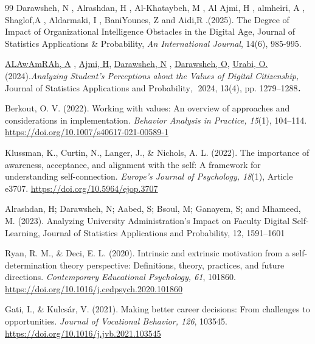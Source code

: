 \documentclass[10pt]{NSP1}
\providecommand{\ul}[1]{\underline{#1}}
\begin{document}
\begin{thebibliography}{99}
 Darawsheh, N , Alrashdan, H , Al-Khataybeh, M , Al Ajmi, H , almheiri, A , Shaglof,A , Aldarmaki, I , BaniYounes, Z and Aidi,R .(2025). The Degree of Impact of Organizational Intelligence Obstacles in the Digital Age, Journal of Statistics Applications \& Probability, \emph{An International Journal}, 14(6), 985-995.

 \href{https://www.scopus.com/authid/detail.uri?authorId=57299687800}{ALAwAmRAh, A} , \href{https://www.scopus.com/authid/detail.uri?authorId=59210073600}{Ajmi, H}, \href{https://www.scopus.com/authid/detail.uri?authorId=59171231500}{Darawsheh, N} , \href{https://www.scopus.com/authid/detail.uri?authorId=58808922400}{Darawsheh, O}, \href{https://www.scopus.com/authid/detail.uri?authorId=59210786400}{Urabi, O.}(2024).\emph{Analyzing Student's Perceptions about the Values of Digital Citizenship,} Journal of Statistics Applications and Probability\emph{,\textbf{~}}2024, 13(4), pp. 1279--1288\emph{\textbf{.}}

 Berkout, O. V. (2022). Working with values: An overview of approaches and considerations in implementation. \emph{Behavior Analysis in Practice, 15}(1), 104--114. \href{https://doi.org/10.1007/s40617-021-00589-1}{\ul{https://doi.org/10.1007/s40617-021-00589-1}}

 Klussman, K., Curtin, N., Langer, J., \& Nichols, A. L. (2022). The importance of awareness, acceptance, and alignment with the self: A framework for understanding self-connection. \emph{Europe's Journal of Psychology, 18}(1), Article e3707. \href{https://doi.org/10.5964/ejop.3707}{\ul{https://doi.org/10.5964/ejop.3707}}

 Alrashdan, H; Darawsheh, N; Aabed, S; Bsoul, M; Ganayem, S; and Mhameed, M. (2023). Analyzing University Administration's Impact on Faculty Digital Self-Learning, Journal of Statistics Applications and Probability, 12, 1591--1601

 Ryan, R. M., \& Deci, E. L. (2020). Intrinsic and extrinsic motivation from a self-determination theory perspective: Definitions, theory, practices, and future directions. \emph{Contemporary Educational Psychology, 61}, 101860. \href{https://doi.org/10.1016/j.cedpsych.2020.101860}{\ul{https://doi.org/10.1016/j.cedpsych.2020.101860}}

 Gati, I., \& Kulcsár, V. (2021). Making better career decisions: From challenges to opportunities. \emph{Journal of Vocational Behavior, 126}, 103545. \href{https://doi.org/10.1016/j.jvb.2021.103545}{\ul{https://doi.org/10.1016/j.jvb.2021.103545}}


\end{thebibliography}
\end{document}
